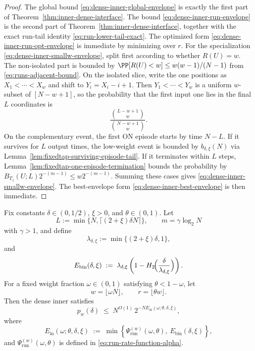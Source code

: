 \begin{proof}
The global bound \eqref{eq:dense-inner-global-envelope} is exactly the first part of
Theorem~\ref{thm:inner-dense-interface}.
The bound \eqref{eq:dense-inner-run-envelope} is the second part of
Theorem~\ref{thm:inner-dense-interface}, together with the exact run-tail identity
\eqref{eq:run-lower-tail-exact}.
The optimized form \eqref{eq:dense-inner-run-opt-envelope} is immediate by minimizing over $r$.
For the specialization \eqref{eq:dense-inner-smallw-envelope}, split first according to whether \(R(U)=w\). The
non-isolated part is bounded by \(\PP[R(U)<w]\le w(w-1)/(N-1)\) from \eqref{eq:runs-adjacent-bound}. On the isolated
slice, write the one positions as \(X_1<\cdots<X_w\) and shift to \(Y_i=X_i-i+1\). Then \(Y_1<\cdots<Y_w\) is a
uniform \(w\)-subset of \([N-w+1]\), so the probability that the first input one lies in the final \(L\) coordinates is
\[
\frac{\binom{L-w+1}{w}}{\binom{N-w+1}{w}}.
\]
On the complementary event, the first ON episode starts by time \(N-L\). If it survives for \(L\) output times, the
low-weight event is bounded by \(b_{\delta,\xi}(N)\) via Lemma~\ref{lem:fixedtap-surviving-episode-tail}. If it
terminates within \(L\) steps, Lemma~\ref{lem:fixedtap-one-episode-termination} bounds the probability by
\(B_{T_1}(U;L)2^{-(m-1)}\le w2^{-(m-1)}\). Summing these cases gives
\eqref{eq:dense-inner-smallw-envelope}.
The best-envelope form \eqref{eq:dense-inner-best-envelope} is then immediate.
\end{proof}

\begin{theorem}
\label{prop:dense-inner-linear-exponent}
Fix constants $\delta\in(0,1/2)$, $\xi>0$, and $\theta\in(0,1)$.
Let
\[
L:=\min\{N,\lceil(2+\xi)\delta N\rceil\},
\qquad
m=\gamma\log_2 N
\]
with $\gamma>1$, and define
\[
\lambda_{\delta,\xi}
:=
\min\{(2+\xi)\delta,1\},
\]
and
\begin{equation}
\label{eq:dense-inner-binomial-exponent}
E_{\mathrm{bin}}(\delta,\xi)
\;:=\;
\lambda_{\delta,\xi}
\left(1-H_2\!\Bigl(\frac{\delta}{\lambda_{\delta,\xi}}\Bigr)\right).
\end{equation}
For a fixed weight fraction $\omega\in(0,1)$ satisfying $\theta<1-\omega$, let
\[
w=\lfloor \omega N\rfloor,
\qquad
r=\lfloor \theta w\rfloor.
\]
Then the dense inner satisfies
\begin{equation}
\label{eq:dense-inner-linear-exponent}
p_w(\delta)
\;\le\;
N^{O(1)}\,
2^{-N E_{\mathrm{in}}(\omega;\theta,\delta,\xi)},
\end{equation}
where
\begin{equation}
\label{eq:dense-inner-linear-rate-function}
E_{\mathrm{in}}(\omega;\theta,\delta,\xi)
\;:=\;
\min\!\left\{
\Psi_{\mathrm{run}}^{(w)}(\omega,\theta),\
E_{\mathrm{bin}}(\delta,\xi)
\right\},
\end{equation}
and $\Psi_{\mathrm{run}}^{(w)}(\omega,\theta)$ is defined in
\eqref{eq:run-rate-function-alpha}.
\end{theorem}

